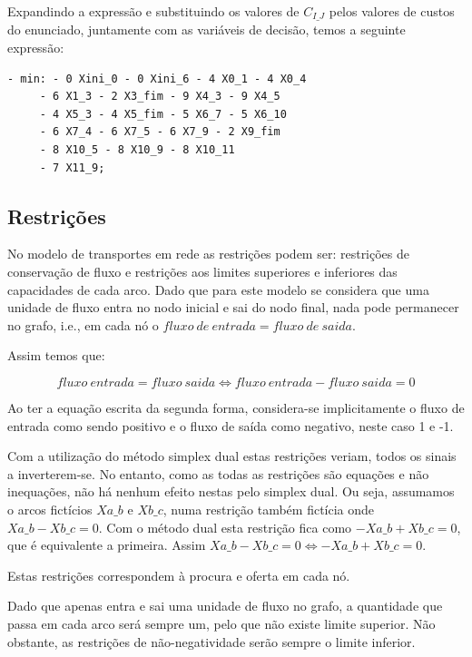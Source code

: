 Expandindo a expressão e substituindo os valores de $C_{I\_J}$ pelos valores de
custos do enunciado, juntamente com as variáveis de decisão, temos a seguinte
expressão:

\begin{verbatim}
- min: - 0 Xini_0 - 0 Xini_6 - 4 X0_1 - 4 X0_4
     - 6 X1_3 - 2 X3_fim - 9 X4_3 - 9 X4_5
     - 4 X5_3 - 4 X5_fim - 5 X6_7 - 5 X6_10
     - 6 X7_4 - 6 X7_5 - 6 X7_9 - 2 X9_fim
     - 8 X10_5 - 8 X10_9 - 8 X10_11
     - 7 X11_9;
\end{verbatim}

\subsection{Restrições}
\label{p1:sec:restricoes}

No modelo de transportes em rede as restrições podem ser: restrições de
conservação de fluxo e restrições aos limites superiores e inferiores das
capacidades de cada arco. Dado que para este modelo se considera que uma unidade
de fluxo entra no nodo inicial e sai do nodo final, nada pode permanecer no
grafo, i.e., em cada nó o $fluxo~de~entrada = fluxo~de~saida$.

Assim temos que:

\begin{displaymath}
fluxo~entrada = fluxo~saida \Leftrightarrow  fluxo~entrada - fluxo~saida = 0
\end{displaymath}

Ao ter a equação escrita da segunda forma, considera-se implicitamente o fluxo
de entrada como sendo positivo e o fluxo de saída como negativo, neste caso
1 e -1.

Com a utilização do método simplex dual estas restrições veriam, todos os sinais
a inverterem-se. No entanto, como as todas as restrições são equações e não
inequações, não há nenhum efeito nestas pelo simplex dual. Ou seja, assumamos
o arcos fictícios $Xa\_b$ e $Xb\_c$, numa restrição também fictícia onde $Xa\_b
- Xb\_c = 0$. Com o método dual esta restrição fica como $-Xa\_b + Xb\_c = 0$,
que é equivalente a primeira. Assim $Xa\_b - Xb\_c = 0 \Leftrightarrow -Xa\_b
+ Xb\_c = 0$.

Estas restrições correspondem à procura e oferta em cada nó.

Dado que apenas entra e sai uma unidade de fluxo no grafo, a quantidade que
passa em cada arco será sempre um, pelo que não existe limite superior. Não
obstante, as restrições de não-negatividade serão sempre o limite inferior.

